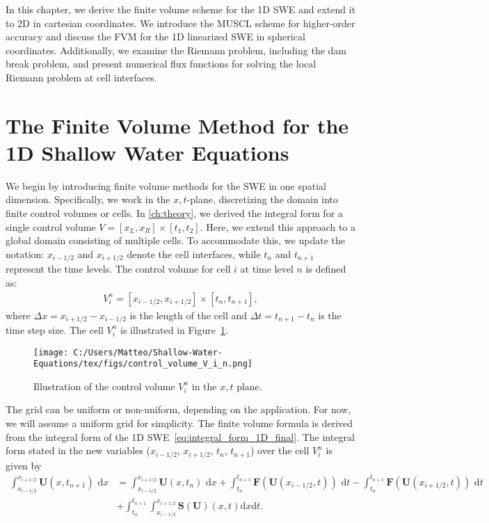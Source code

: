 In this chapter, we derive the finite volume scheme for the 1D SWE and extend it to 2D in cartesian coordinates.
We introduce the MUSCL scheme for higher-order accuracy and discuss the FVM for the 1D linearized SWE in spherical coordinates.
Additionally, we examine the Riemann problem, including the dam break problem, and present numerical flux functions for solving the local Riemann problem at cell interfaces.

\section{The Finite Volume Method for the 1D Shallow Water Equations}\label{sec:FVM_1D_SWE}
We begin by introducing finite volume methods for the SWE in one spatial dimension.
Specifically, we work in the \(x,t\)-plane, discretizing the domain into finite control volumes or cells.
In \autoref{ch:theory}, we derived the integral form for a single control volume \(V = [x_L, x_R] \times [t_1, t_2]\).
Here, we extend this approach to a global domain consisting of multiple cells.
To accommodate this, we update the notation: \(x_{i-1/2}\) and \(x_{i+1/2}\) denote the cell interfaces, while \(t_n\) and \(t_{n+1}\) represent the time levels.
The control volume for cell $i$ at time level $n$ is defined as:
\begin{align*}
    V_i^n = [x_{i-1/2}, x_{i+1/2}] \times [t_n, t_{n+1}],
\end{align*}
where $\Delta x = x_{i+1/2} - x_{i-1/2}$ is the length of the cell and $\Delta t = t_{n+1} - t_n$ is the time step size.
The cell $V_i^n$ is illustrated in Figure~\ref{fig:control_volume_V_i_n}.
\begin{figure}[H]
    \centering
    \texttt{[image: C:/Users/Matteo/Shallow-Water-Equations/tex/figs/control\_volume\_V\_i\_n.png]}
    \caption{Illustration of the control volume $V_i^n$ in the $x,t$ plane.}\label{fig:control_volume_V_i_n}
\end{figure}
The grid can be uniform or non-uniform, depending on the application.
For now, we will assume a uniform grid for simplicity.
The finite volume formula is derived from the integral form of the 1D SWE~\eqref{eq:integral_form_1D_final}.
The integral form stated in the new variables ($x_{i-1/2}$, $x_{i+1/2}$, $t_n$, $t_{n+1}$) over the cell $V_i^n$ is given by
\begin{equation}\label{eq:integral_form_1D_SWE_new_variables}
    \begin{aligned}
    \int_{x_{i-1/2}}^{x_{i+1/2}} \mathbf{U}(x,t_{n+1}) \text{ d}x &= 
    \int_{x_{i-1/2}}^{x_{i+1/2}} \mathbf{U}(x,t_n) \text{ d}x + 
    \int_{t_n}^{t_{n+1}} \mathbf{F}(\mathbf{U}(x_{i-1/2}, t)) \text{ d}t -
    \int_{t_n}^{t_{n+1}} \mathbf{F}(\mathbf{U}(x_{i+1/2}, t)) \text{ d}t \\
    &+
    \int_{t_n}^{t_{n+1}} \int_{x_{i-1/2}}^{x_{i+1/2}} \mathbf{S(U)}(x,t) \text{d}x \text{d}t.
    \end{aligned}
\end{equation}
